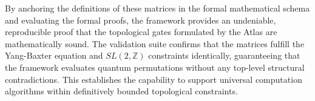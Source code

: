 By anchoring the definitions of these matrices in the formal mathematical schema and evaluating the formal proofs, the framework provides an undeniable, reproducible proof that the topological gates formulated by the Atlas are mathematically sound. The validation suite confirms that the matrices fulfill the Yang-Baxter equation and $SL(2, \mathbb{Z})$ constraints identically, guaranteeing that the framework evaluates quantum permutations without any top-level structural contradictions. This establishes the capability to support universal computation algorithms within definitively bounded topological constraints.
